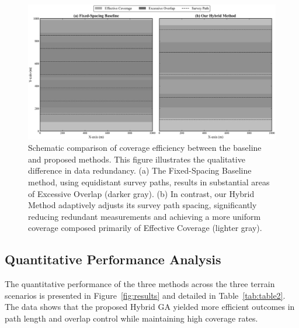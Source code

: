 \documentclass[compress]{cm}
\begin{document}
\begin{figure}[H]
	\centering
	\includegraphics[width=\textwidth]{pic/2.png}
	\caption{Schematic comparison of coverage efficiency between the baseline and proposed methods. This figure illustrates the qualitative difference in data redundancy. (a) The Fixed-Spacing Baseline method, using equidistant survey paths, results in substantial areas of Excessive Overlap (darker gray). (b) In contrast, our Hybrid Method adaptively adjusts its survey path spacing, significantly reducing redundant measurements and achieving a more uniform coverage composed primarily of Effective Coverage (lighter gray).}
	\label{fig:schematic}
\end{figure}


\subsection{Quantitative Performance Analysis}
The quantitative performance of the three methods across the three terrain scenarios is presented in Figure~\ref{fig:results} and detailed in Table~\ref{tab:table2}. The data shows that the proposed Hybrid GA yielded more efficient outcomes in path length and overlap control while maintaining high coverage rates.
\end{document}
